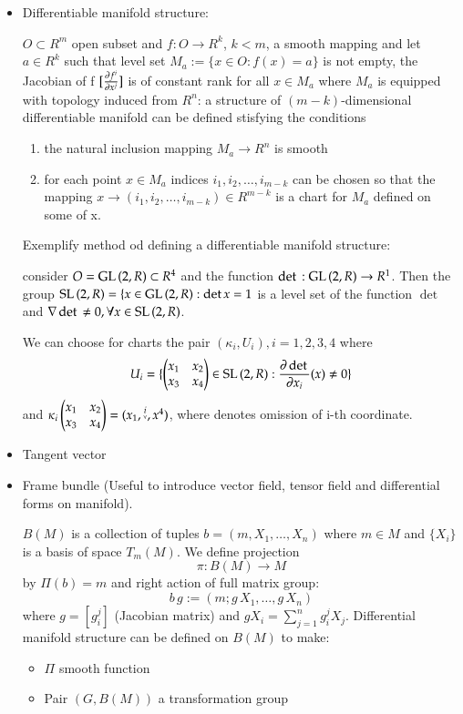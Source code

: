\documentclass[oneside,12pt]{memoir}
\begin{document}
\begin{itemize}

\item Differentiable manifold structure:

$O\subset R^m$ open subset and $f:O\to R^k$, $k<m$, a smooth mapping and let $a\in R^k$ such that level set $M_a:=\{x\in O: f(x)=a\}$ is not empty, the Jacobian of f $[\PDy{x^j}{f^i}]$ is of constant rank for all $x\in M_a$ where $M_a$ is equipped with topology induced from $R^n$: a structure of $(m-k)$-dimensional differentiable manifold can be defined stisfying the conditions

\begin{enumerate}
\item the natural inclusion mapping $M_a\to R^n$ is smooth
\item for each point $x\in M_a$ indices $i_1,i_2,\ldots,i_{m-k}$ can be chosen so that the mapping $x\to(i_1,i_2,\ldots,i_{m-k})\in R^{m-k}$ is a chart for $M_a$ defined on some \nhd{} of x.
\end{enumerate}

Exemplify method od defining a differentiable manifold structure:

consider $O=\GL{(2,R)}\subset R^4$ and the function $\det{}:\GL{(2,R)}\to R^1$. Then the group $\SL{(2,R)}=\{x\in\GL{(2,R):\det{x}=1}$ is a level set of the function $\det{}$ and $\nabla\det{}\neq0, \forall x\in\SL{(2,R)}$.

We can choose for charts the pair $(\kappa_i,U_i), i=1,2,3,4$ where 
\begin{equation*}
U_i=\{\TwoperTwo{x_1}{x_2}{x_3}{x_4}\in\SL{(2,R): \PDy{x_i}{\det{}}(x)\neq0}\}
\end{equation*}
and $\kappa_i\TwoperTwo{x_1}{x_2}{x_3}{x_4}=(x_1,\missing{i},x^4)$, where denotes omission of i-th coordinate.
\item Tangent vector
\item Frame bundle (Useful to introduce vector field, tensor field and differential forms on manifold).

$B(M)$ is a collection of tuples $b=(m,X_1,\ldots,X_n)$ where $m\in M$ and $\{X_i\}$ is a basis of space $T_m(M)$. We define projection
\begin{equation*}
\pi:B(M)\to M
\end{equation*}
by $\Pi(b)=m$ and right action of full matrix group:
\begin{equation*}
b\,g:=(m;g\,X_1,\ldots,g\,X_n)
\end{equation*}
where $g=[g_i^j]$ (Jacobian matrix) and $gX_i=\sum_{j=1}^ng_i^jX_j$.
Differential manifold structure can be defined on $B(M)$ to make:
\begin{itemize}
\item $\Pi$ smooth function
\item Pair $(G, B(M))$ a transformation group
\end{itemize}


\end{itemize}
\end{document}
